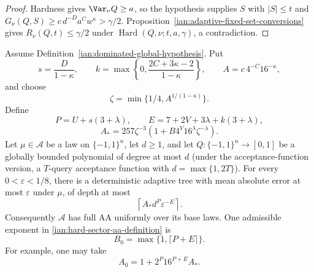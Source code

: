 \begin{proof}
Hardness gives \(\Var_\nu Q\ge a\), so the hypothesis supplies \(S\)
with \(|S|\le t\) and \(G_\nu(Q,S)\ge c\,d^{-D}a^Cw^\kappa>\gamma/2\).
Proposition~\ref{ian:adaptive-fixed-set-conversions} gives
\(R_\nu(Q,t)\le\gamma/2\) under \(\operatorname{Hard}(Q,\nu;t,a,\gamma)\),
a contradiction.
\end{proof}

\begin{theorem}
\label{ian:dominated-global-full-aa}
Assume Definition~\ref{ian:dominated-global-hypothesis}. Put
\[
 s=\frac{D}{1-\kappa},
 \qquad
 k=\max\left\{0,\frac{2C+3\kappa-2}{1-\kappa}\right\},
 \qquad
 A=c\,4^{-C}16^{-\kappa},
\]
and choose
\[
 \zeta=\min\{1/4,A^{1/(1-\kappa)}\}.
\]
Define
\[
 P=U+s(3+\lambda),
 \qquad
 E=7+2V+3\lambda+k(3+\lambda),
\]
\[
 A_*=
 257\zeta^{-3}\left(1+B4^V16^\lambda \zeta^{-\lambda}\right).
\]
Let \(\mu\in\mathcal A\) be a law on \(\{-1,1\}^n\), let \(d\ge1\), and
let \(Q:\{-1,1\}^n\to[0,1]\) be a globally bounded polynomial of degree
at most \(d\) (under the acceptance-function version, a \(T\)-query
acceptance function with \(d=\max\{1,2T\}\)). For every
\(0<\varepsilon<1/8\), there is a deterministic adaptive tree with mean
absolute error at most \(\varepsilon\) under \(\mu\), of depth at most
\[
 \left\lceil A_*d^P\varepsilon^{-E}\right\rceil.
\]
Consequently \(\mathcal A\) has full AA uniformly over its base laws.
One admissible exponent in
\eqref{ian:hard-sector-aa-definition} is
\[
 B_0=\max\{1,\lceil P+E\rceil\}.
\]
For example, one may take
\[
 A_0=1+2^P16^{P+E}A_*.
\]
\end{theorem}

